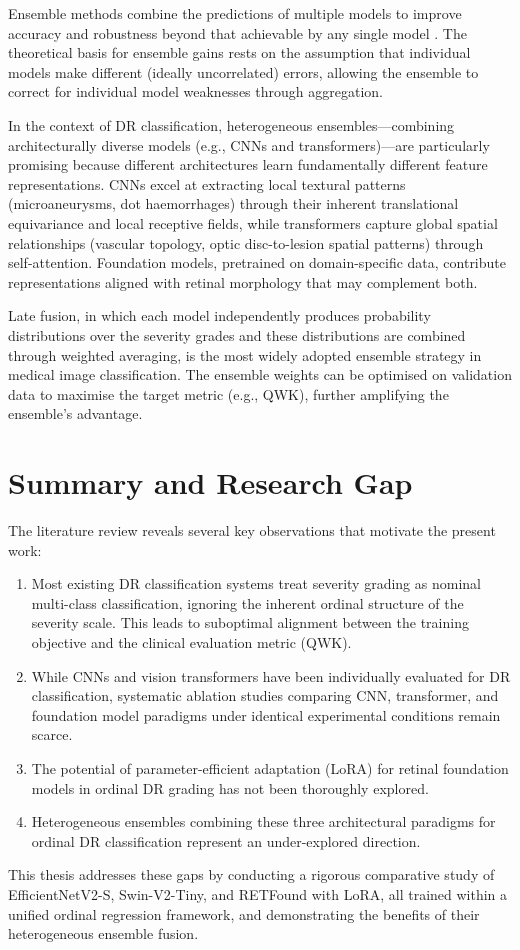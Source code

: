 Ensemble methods combine the predictions of multiple models to improve accuracy and robustness beyond that achievable by any single model \cite{dietterich2000ensemble}. The theoretical basis for ensemble gains rests on the assumption that individual models make different (ideally uncorrelated) errors, allowing the ensemble to correct for individual model weaknesses through aggregation.

In the context of DR classification, heterogeneous ensembles---combining architecturally diverse models (e.g., CNNs and transformers)---are particularly promising because different architectures learn fundamentally different feature representations. CNNs excel at extracting local textural patterns (microaneurysms, dot haemorrhages) through their inherent translational equivariance and local receptive fields, while transformers capture global spatial relationships (vascular topology, optic disc-to-lesion spatial patterns) through self-attention. Foundation models, pretrained on domain-specific data, contribute representations aligned with retinal morphology that may complement both.

Late fusion, in which each model independently produces probability distributions over the severity grades and these distributions are combined through weighted averaging, is the most widely adopted ensemble strategy in medical image classification. The ensemble weights can be optimised on validation data to maximise the target metric (e.g., QWK), further amplifying the ensemble's advantage.

\section{Summary and Research Gap}
\label{sec:lit_summary}

The literature review reveals several key observations that motivate the present work:

\begin{enumerate}
    \item Most existing DR classification systems treat severity grading as nominal multi-class classification, ignoring the inherent ordinal structure of the severity scale. This leads to suboptimal alignment between the training objective and the clinical evaluation metric (QWK).
    
    \item While CNNs and vision transformers have been individually evaluated for DR classification, systematic ablation studies comparing CNN, transformer, and foundation model paradigms under identical experimental conditions remain scarce.
    
    \item The potential of parameter-efficient adaptation (LoRA) for retinal foundation models in ordinal DR grading has not been thoroughly explored.
    
    \item Heterogeneous ensembles combining these three architectural paradigms for ordinal DR classification represent an under-explored direction.
\end{enumerate}

This thesis addresses these gaps by conducting a rigorous comparative study of EfficientNetV2-S, Swin-V2-Tiny, and RETFound with LoRA, all trained within a unified ordinal regression framework, and demonstrating the benefits of their heterogeneous ensemble fusion.

